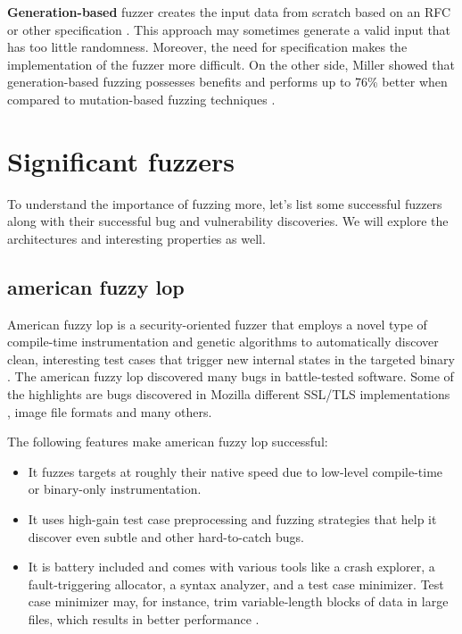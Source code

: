 \textbf{Generation-based} fuzzer creates the input data from scratch based on an RFC or other specification \cite{miller2007analysis}. This approach may sometimes generate a valid input that has too little randomness. Moreover, the need for specification makes the implementation of the fuzzer more difficult. On the other side, Miller showed that generation-based fuzzing possesses benefits and performs up to 76\% better when compared to mutation-based fuzzing techniques \cite{miller2007analysis}.


\section{Significant fuzzers}
\label{ssub:Significant fuzzers}
To understand the importance of fuzzing more, let's list some successful fuzzers along with their successful bug and vulnerability discoveries. We will explore the architectures and interesting properties as well.

\subsection{american fuzzy lop}
American fuzzy lop is a security-oriented fuzzer that employs a novel type of compile-time instrumentation and genetic algorithms to automatically discover clean, interesting test cases that trigger new internal states in the targeted binary \cite{zalewski2018american}. The american fuzzy lop discovered many bugs in battle-tested software. Some of the highlights are bugs discovered in Mozilla \cite{zalewski2014uninitialized, zalewski2014two, zalewski2015uninitialized, mozzilla2015update} different SSL/TLS implementations \cite{bock2015out, sharma2014gnutls}, image file formats \cite{zalewski2013ijg, cunningham2014segv} and many others.

The following features make american fuzzy lop successful:
\begin{itemize}
    \item It fuzzes targets at roughly their native speed due to low-level compile-time or binary-only instrumentation.
    \item It uses high-gain test case preprocessing and fuzzing strategies that help it discover even subtle and other hard-to-catch bugs.
    \item It is battery included and comes with various tools like a crash explorer, a fault-triggering allocator, a syntax analyzer, and a test case minimizer. Test case minimizer may, for instance, trim variable-length blocks of data in large files, which results in better performance \cite{afl2019docs}.
\end{itemize}

